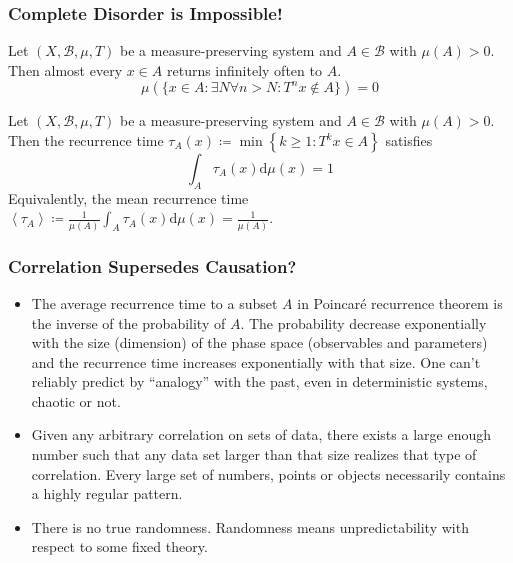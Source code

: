 \documentclass[UTF8,aspectratio=43,11pt,colorlinks,compress,openany]{beamer}%
\begin{document}
\begin{frame}\frametitle{Complete Disorder is Impossible!}
	\begin{theorem}
		Let $(X,{\mathcal{B}},\mu,T)$ be a measure-preserving system and $A\in\mathcal{B}$ with $\mu(A) > 0$. Then almost every $x\in A$ returns infinitely often to $A$.
		\[
		\mu\left(\{x\in A: \exists N\forall n>N: T^n x\notin A\}\right)=0
		\]
	\end{theorem}
	\begin{lemma}
		Let $(X,{\mathcal{B}},\mu,T)$ be a measure-preserving system and $A\in\mathcal{B}$ with $\mu(A) > 0$. Then the recurrence time $\tau_A(x)\coloneqq \min\left\{k\geq 1: T^k x\in A\right\}$ satisfies
		\[\int_A\!\tau_A(x)\mathrm{d}\mu(x)=1\]
		Equivalently, the mean recurrence time $\left\langle \tau_A\right\rangle\coloneqq \frac{1}{\mu(A)}\int_A\!\tau_A(x)\mathrm{d}\mu(x)=\frac{1}{\mu(A)}$.
	\end{lemma}
\end{frame}

\begin{frame}\frametitle{Correlation Supersedes Causation?}
	\begin{itemize}
		\item The average recurrence time to a subset $A$ in Poincar\'e recurrence theorem is the inverse of the probability of $A$. The probability decrease exponentially with the size (dimension) of the phase space (observables and parameters) and the recurrence time increases exponentially with that size. One can't reliably predict by ``analogy'' with the past, even in deterministic systems, chaotic or not.
		\item Given any arbitrary correlation on sets of data, there exists a large enough number such that any data set larger than that size realizes that type of correlation. Every large set of numbers, points or objects necessarily contains a highly regular pattern.
		\item There is no true randomness. Randomness means unpredictability with respect to some fixed theory.
	\end{itemize}
\end{frame}
\end{document}
